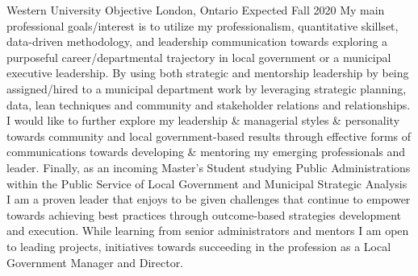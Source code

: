 
\begin{cventries}

  \cventry
    {Western University} %
    {Objective} %
    {London, Ontario } %
    {Expected Fall 2020} %
    {
    My main professional goals/interest is to utilize my professionalism, quantitative skillset, data-driven methodology, and leadership communication towards exploring a purposeful career/departmental trajectory in local government or a municipal executive leadership. By using both strategic and mentorship leadership by being assigned/hired to a  municipal department work by leveraging strategic planning, data, lean techniques and community and stakeholder relations and relationships. I would like to further explore my leadership \& managerial styles \& personality towards community and local government-based results through effective forms of communications towards developing \& mentoring my emerging professionals and leader. Finally, as an incoming Master's Student studying Public Administrations within the Public Service of Local Government and Municipal Strategic Analysis I am a proven leader that enjoys to be given challenges that continue to empower towards achieving best practices through outcome-based strategies development and execution. While learning from senior administrators and mentors I am open to leading projects, initiatives  towards succeeding in the profession as a Local Government Manager and Director.
    }

\end{cventries}
